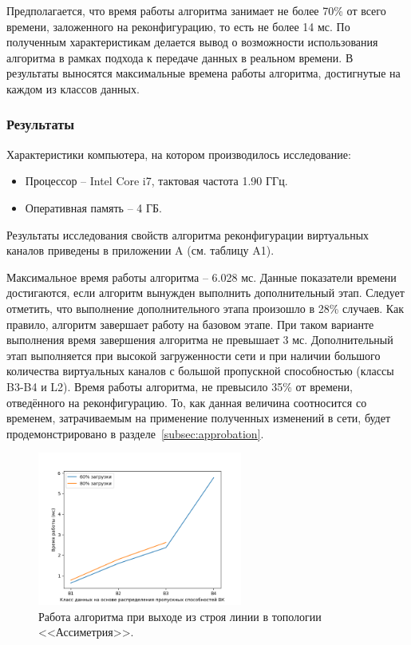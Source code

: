 \documentclass[12pt, a4paper]{article}
\begin{document}
Предполагается, что время работы алгоритма занимает не более 70\% от всего времени, заложенного на реконфигурацию, то есть не более 14 мс. По полученным характеристикам делается вывод о возможности использования алгоритма в рамках подхода к передаче данных в реальном времени. В результаты выносятся максимальные времена работы алгоритма, достигнутые на каждом из классов данных.
 
\subsubsection{Результаты}
Характеристики компьютера, на котором производилось исследование:
\begin{itemize}
	\item Процессор -- Intel Core i7, тактовая частота 1.90 ГГц.
	\item Оперативная память -- 4 ГБ.
\end{itemize}

Результаты исследования свойств алгоритма реконфигурации виртуальных каналов приведены в приложении A (см. таблицу A1).

Максимальное время работы алгоритма – 6.028 мс. Данные показатели времени достигаются, если алгоритм вынужден выполнить дополнительный этап. Следует отметить, что выполнение дополнительного этапа произошло в 28\% случаев. Как правило, алгоритм завершает работу на базовом этапе. При таком варианте выполнения время завершения алгоритма не превышает 3 мс. Дополнительный этап выполняется при высокой загруженности сети и при наличии большого количества виртуальных каналов с большой пропускной способностью (классы B3-B4 и L2). Время работы алгоритма, не превысило 35\% от времени, отведённого на реконфигурацию. То, как данная величина соотносится со временем, затрачиваемым на применение полученных изменений в сети, будет продемонстрировано в разделе~\ref{subsec:approbation}.

\begin{figure}[h!]
	\centering
	\includegraphics[width=0.60\textwidth]{img/5node_res.png}
	\caption{Работа алгоритма при выходе из строя линии в топологии <<Ассиметрия>>.}
	\label{pic:5node_res}
\end{figure}
\end{document}
